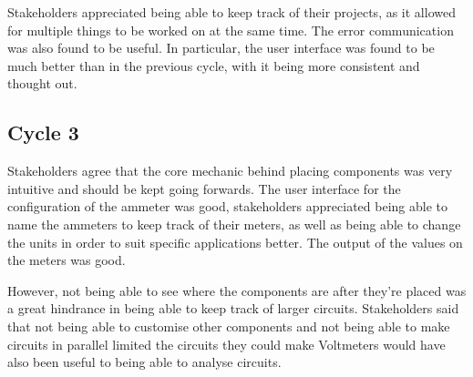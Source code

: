             Stakeholders appreciated being able to keep track of their projects, as it allowed for multiple things to be worked on at the same time. 
            The error communication was also found to be useful.
            In particular, the user interface was found to be much better than in the previous cycle, with it being more consistent and thought out.


        \subsection{Cycle 3}

            Stakeholders agree that the core mechanic behind placing components was very intuitive and should be kept going forwards. 
            The user interface for the configuration of the ammeter was good, stakeholders appreciated being able to name the ammeters to keep track of their meters, as well as being able to change the units in order to suit specific applications better. 
            The output of the values on the meters was good. 
            
            However, not being able to see where the components are after they're placed was a great hindrance in being able to keep track of larger circuits.
            Stakeholders said that not being able to customise other components and not being able to make circuits in parallel limited the circuits they could make
            Voltmeters would have also been useful to being able to analyse circuits. 